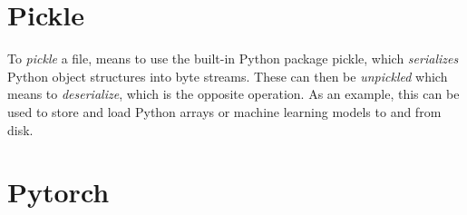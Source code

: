         
    \section{Pickle}
        To \textit{pickle}\cite{pickle} a file, means to use the built-in Python package pickle, which \textit{serializes} Python object structures into byte streams. These can then be \textit{unpickled} which means to \textit{deserialize}, which is the opposite operation. As an example, this can be used to store and load Python arrays or machine learning models to and from disk.
        
        
    \section{Pytorch} \label{Pytorch}